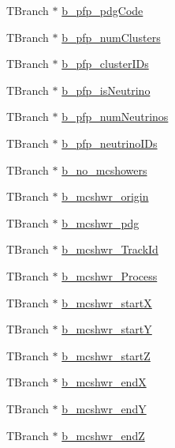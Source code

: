 \begin{DoxyCompactItemize}
\item 
T\-Branch $\ast$ \hyperlink{classanatree_af91df6f47b01f670143259247dfd9e72}{b\-\_\-pfp\-\_\-pdg\-Code}
\item 
T\-Branch $\ast$ \hyperlink{classanatree_a49934506a08737111826ce208573969a}{b\-\_\-pfp\-\_\-num\-Clusters}
\item 
T\-Branch $\ast$ \hyperlink{classanatree_ae3798617360ef810c3ea6a2ab02ceeec}{b\-\_\-pfp\-\_\-cluster\-I\-Ds}
\item 
T\-Branch $\ast$ \hyperlink{classanatree_a7fc996df14b3c81e085bb1e986a03f06}{b\-\_\-pfp\-\_\-is\-Neutrino}
\item 
T\-Branch $\ast$ \hyperlink{classanatree_a5f21e392e8debeb636dbc0df099de7d0}{b\-\_\-pfp\-\_\-num\-Neutrinos}
\item 
T\-Branch $\ast$ \hyperlink{classanatree_abcb3e7aa1f5ad179314b3d15f58827ec}{b\-\_\-pfp\-\_\-neutrino\-I\-Ds}
\item 
T\-Branch $\ast$ \hyperlink{classanatree_ad446412d63d834a7d48a3041d1f8f2b7}{b\-\_\-no\-\_\-mcshowers}
\item 
T\-Branch $\ast$ \hyperlink{classanatree_ad8c0ae84236881be75952b86b28e50f9}{b\-\_\-mcshwr\-\_\-origin}
\item 
T\-Branch $\ast$ \hyperlink{classanatree_ad1a779beb5082c920ee1cd680a6cfe9b}{b\-\_\-mcshwr\-\_\-pdg}
\item 
T\-Branch $\ast$ \hyperlink{classanatree_a2d47765807edcdd51399e7f2b7fce0ff}{b\-\_\-mcshwr\-\_\-\-Track\-Id}
\item 
T\-Branch $\ast$ \hyperlink{classanatree_a21a80d239c6c7c1c615b4e2407428720}{b\-\_\-mcshwr\-\_\-\-Process}
\item 
T\-Branch $\ast$ \hyperlink{classanatree_a7ef7958b16e3383fa03795e4e16b9363}{b\-\_\-mcshwr\-\_\-start\-X}
\item 
T\-Branch $\ast$ \hyperlink{classanatree_acc1677d9637b7b0aa644e6a6b0a54f4f}{b\-\_\-mcshwr\-\_\-start\-Y}
\item 
T\-Branch $\ast$ \hyperlink{classanatree_a82cc353273ebfa80e40bba2798d1dbb3}{b\-\_\-mcshwr\-\_\-start\-Z}
\item 
T\-Branch $\ast$ \hyperlink{classanatree_a861277cff62a8cb363ad8016301197b0}{b\-\_\-mcshwr\-\_\-end\-X}
\item 
T\-Branch $\ast$ \hyperlink{classanatree_a1ff19bbcff994abb11b6a066154a4a43}{b\-\_\-mcshwr\-\_\-end\-Y}
\item 
T\-Branch $\ast$ \hyperlink{classanatree_a134bd4c0b3550948069ac1b14772b5ba}{b\-\_\-mcshwr\-\_\-end\-Z}
\item 

\end{DoxyCompactItemize}
